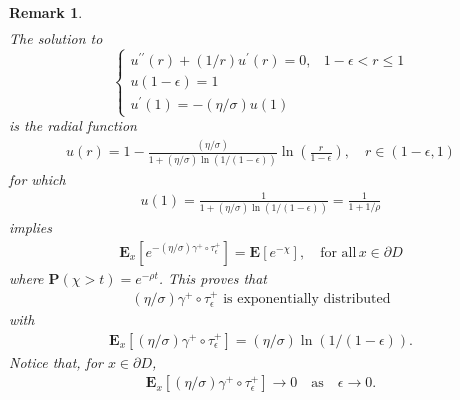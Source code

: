\documentclass[11pt,a4paper]{article}
\newtheorem{remark}{Remark}[section]
\begin{document}
{\begin{remark}
\begin{align*}
\end{align*}
The solution to
\begin{equation*}
\left\lbrace
\begin{array}{ll}
\displaystyle u^{\prime \prime}(r) + (1/r) u^\prime(r) = 0, & 1-\epsilon < r \leq 1\\
\displaystyle u(1-\epsilon)=1 \\
\displaystyle u^\prime(1) = - (\eta/\sigma) u(1)
\end{array}
\right .
\end{equation*}
is the radial function
\begin{align*}
u(r) = 1 - \frac{(\eta/\sigma)}{ 1 + (\eta/\sigma) \ln (1/(1-\epsilon))} \ln \left( \frac{r}{1-\epsilon} \right), \quad r \in (1-\epsilon, 1)
\end{align*}
for which 
\begin{align*}
u(1) = \frac{1}{1 + (\eta/\sigma) \ln (1/(1-\epsilon))} = \frac{1}{1 + 1/\rho}
\end{align*}
implies
\begin{align*}
\mathbf{E}_x[e^{- (\eta/\sigma) \gamma^+\circ \tau^+_\epsilon }] = \mathbf{E}[e^{-\chi}], \quad \textrm{for all}\, x \in \partial D
\end{align*}
where $\mathbf{P}(\chi > t) = e^{-\rho t}$. This proves that
\begin{align*}
(\eta/\sigma) \gamma^+\circ \tau^+_\epsilon \textrm{ is exponentially distributed} 
\end{align*}
with
\begin{align*}
\mathbf{E}_x[(\eta/\sigma) \gamma^+\circ \tau^+_\epsilon] = (\eta/\sigma) \ln(1/(1-\epsilon)).
\end{align*}
Notice that, for $x \in \partial D$,
\begin{align*}
\mathbf{E}_x[(\eta/\sigma) \gamma^+\circ \tau^+_\epsilon]  \to 0 \quad \textrm{as} \quad \epsilon \to 0.
\end{align*}  
\end{remark}


}
\end{document}
